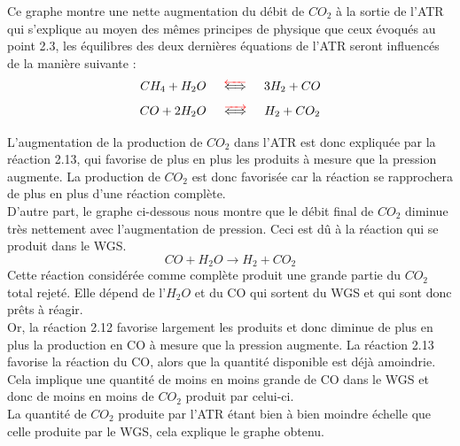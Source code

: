 \documentclass[12pt]{report}
\begin{document}
Ce graphe montre une nette augmentation du débit de $CO_2$ à la sortie de l'ATR qui s'explique au moyen des mêmes principes de physique que ceux  évoqués au point 2.3, les équilibres des deux dernières équations de l'ATR seront influencés de la manière suivante :\\

 \begin{equation}
 CH_4 + H_2O \hspace{0.5cm}\textcolor{red}{\overleftarrow{\textcolor{black}{\Longleftrightarrow}}} \hspace{0.5cm} 3H_2 + CO
 \end{equation}
 \begin{equation}
 CO + 2H_2O \hspace{0.5cm}\textcolor{red}{\overrightarrow{\textcolor{black}{\Longleftrightarrow}}} \hspace{0.5cm} H_2 + CO_2
 \end{equation}

L'augmentation de la production de $CO_2$ dans l'ATR est donc expliquée par la réaction 2.13, qui favorise de plus en plus les produits à mesure que la pression augmente. La production de $CO_2$ est donc favorisée car la réaction se rapprochera de plus en plus d'une réaction complète.\\

D'autre part, le graphe ci-dessous nous montre que le débit final de $CO_2$ diminue très nettement avec l'augmentation de pression. Ceci est dû à la réaction qui se produit dans le WGS.
\begin{equation}
CO + H_2O \rightarrow H_2 + CO_2
\end{equation}
Cette réaction considérée comme complète produit une grande partie du $CO_2$ total rejeté. Elle dépend de l'$H_2O$ et du CO qui sortent du WGS et qui sont donc prêts à réagir.\\
Or, la réaction 2.12 favorise largement les produits et donc diminue de plus en plus la production en CO à mesure que la pression augmente. La réaction 2.13 favorise la réaction du CO, alors que la quantité disponible est déjà amoindrie.\\
Cela implique une quantité de moins en moins grande de CO dans le WGS et donc de moins en moins de $CO_2$ produit par celui-ci.\\
La quantité de $CO_2$ produite par l'ATR étant bien à bien moindre échelle que celle produite par le WGS, cela explique le graphe obtenu.\\
\end{document}
